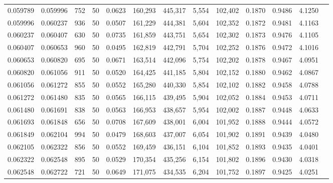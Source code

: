 \begin{tabular}{rrrrrrrrrrrrr}
0.059789 & 0.059996 &   752 &  50 &                                     0.0623 & 160,293 & 445,317 &   5,554 & 102,402 & 0.1870 & 0.9486 & 4.1250 \\
0.059996 & 0.060237 &   936 &  50 &                                     0.0507 & 161,229 & 444,381 &   5,604 & 102,352 & 0.1872 & 0.9481 & 4.1163 \\
0.060237 & 0.060407 &   630 &  50 &                                     0.0735 & 161,859 & 443,751 &   5,654 & 102,302 & 0.1873 & 0.9476 & 4.1105 \\
0.060407 & 0.060653 &   960 &  50 &                                     0.0495 & 162,819 & 442,791 &   5,704 & 102,252 & 0.1876 & 0.9472 & 4.1016 \\
0.060653 & 0.060820 &   695 &  50 &                                     0.0671 & 163,514 & 442,096 &   5,754 & 102,202 & 0.1878 & 0.9467 & 4.0951 \\
0.060820 & 0.061056 &   911 &  50 &                                     0.0520 & 164,425 & 441,185 &   5,804 & 102,152 & 0.1880 & 0.9462 & 4.0867 \\
0.061056 & 0.061272 &   855 &  50 &                                     0.0552 & 165,280 & 440,330 &   5,854 & 102,102 & 0.1882 & 0.9458 & 4.0788 \\
0.061272 & 0.061480 &   835 &  50 &                                     0.0565 & 166,115 & 439,495 &   5,904 & 102,052 & 0.1884 & 0.9453 & 4.0711 \\
0.061480 & 0.061691 &   838 &  50 &                                     0.0563 & 166,953 & 438,657 &   5,954 & 102,002 & 0.1887 & 0.9448 & 4.0633 \\
0.061693 & 0.061848 &   656 &  50 &                                     0.0708 & 167,609 & 438,001 &   6,004 & 101,952 & 0.1888 & 0.9444 & 4.0572 \\
0.061849 & 0.062104 &   994 &  50 &                                     0.0479 & 168,603 & 437,007 &   6,054 & 101,902 & 0.1891 & 0.9439 & 4.0480 \\
0.062105 & 0.062322 &   856 &  50 &                                     0.0552 & 169,459 & 436,151 &   6,104 & 101,852 & 0.1893 & 0.9435 & 4.0401 \\
0.062322 & 0.062548 &   895 &  50 &                                     0.0529 & 170,354 & 435,256 &   6,154 & 101,802 & 0.1896 & 0.9430 & 4.0318 \\
0.062548 & 0.062722 &   721 &  50 &                                     0.0649 & 171,075 & 434,535 &   6,204 & 101,752 & 0.1897 & 0.9425 & 4.0251 \\

\end{tabular}
